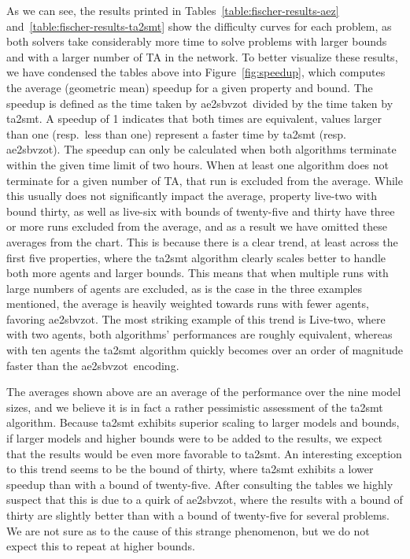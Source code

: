 \documentclass[a4paper,11pt]{report}
\theoremstyle{definition}
\newcommand{\aez}{ae2sbvzot}
\begin{document}
As we can see, the results printed in Tables~\ref{table:fischer-results-aez}
and~\ref{table:fischer-results-ta2smt} show the difficulty curves for each
problem, as both solvers take considerably more time to solve problems with
larger bounds and with a larger number of TA in the network. To better visualize
these results, we have condensed the tables above into Figure~\ref{fig:speedup},
which computes the average (geometric mean) speedup for a given property and
bound. The speedup is defined as the time taken by \aez\ divided by the time
taken by ta2smt. A speedup of 1 indicates that both times are equivalent, values
larger than one (resp.\ less than one) represent a faster time by ta2smt (resp.
\aez). The speedup can only be calculated when both algorithms terminate within
the given time limit of two hours. When at least one algorithm does not
terminate for a given number of TA, that run is excluded from the average. While
this usually does not significantly impact the average, property live-two with
bound thirty, as well as live-six with bounds of twenty-five and thirty have
three or more runs excluded from the average, and as a result we have omitted
these averages from the chart. This is because there is a clear trend, at least
across the first five properties, where the ta2smt algorithm clearly scales
better to handle both more agents and larger bounds. This means that when
multiple runs with large numbers of agents are excluded, as is the case in the
three examples mentioned, the average is heavily weighted towards runs with
fewer agents, favoring \aez. The most striking example of this trend is
Live-two, where with two agents, both algorithms' performances are roughly
equivalent, whereas with ten agents the ta2smt algorithm quickly becomes over an
order of magnitude faster than the \aez\ encoding.

The averages shown above are an average of the performance over the nine model
sizes, and we believe it is in fact a rather pessimistic assessment of the
ta2smt algorithm. Because ta2smt exhibits superior scaling to larger models and
bounds, if larger models and higher bounds were to be added to the results, we
expect that the results would be even more favorable to ta2smt. An interesting
exception to this trend seems to be the bound of thirty, where ta2smt exhibits a
lower speedup than with a bound of twenty-five. After consulting the tables we
highly suspect that this is due to a quirk of \aez, where the results with a
bound of thirty are slightly better than with a bound of twenty-five for several
problems. We are not sure as to the cause of this strange phenomenon, but we do
not expect this to repeat at higher bounds.
\end{document}
